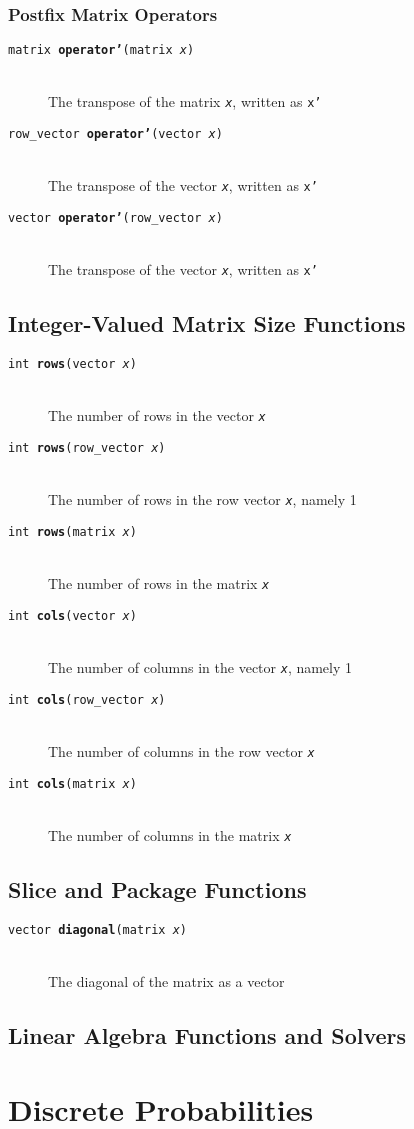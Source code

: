 \documentclass[10pt]{report}
\newcommand{\code}[1]{{\tt #1}}
\newcommand{\fitem}[4]{\item[{\tt #1 {\bfseries #2}(#3)}]\mbox{ } \\[4pt] #4}
\newcommand{\farg}[1]{{\tt\slshape #1}}
\begin{document}
\subsection{Postfix Matrix Operators}

\begin{description}
%
\fitem{matrix}{operator'}{matrix \farg{x}}{The transpose of the matrix
  \farg{x}, written as \code{x'}}
%
\fitem{row\_vector}{operator'}{vector \farg{x}}{The transpose of the vector
  \farg{x}, written as \code{x'}}
%
\fitem{vector}{operator'}{row\_vector \farg{x}}{The transpose of the vector
  \farg{x}, written as \code{x'}}
%
\end{description}


\section{Integer-Valued Matrix Size Functions}

\begin{description}
%
\fitem{int}{rows}{vector \farg{x}}{The number of
rows in the vector \farg{x}}
%
\fitem{int}{rows}{row\_vector \farg{x}}{The number of
rows in the row vector \farg{x}, namely 1}
%
\fitem{int}{rows}{matrix \farg{x}}{The number of
rows in the matrix \farg{x}}
%
\fitem{int}{cols}{vector \farg{x}}{The number of columns
in the vector \farg{x}, namely 1}
%
\fitem{int}{cols}{row\_vector \farg{x}}{The number of columns
in the row vector \farg{x}}
%
\fitem{int}{cols}{matrix \farg{x}}{The number of columns
in the matrix \farg{x}}
\end{description}

\section{Slice and Package Functions}

\begin{description}
%
\fitem{vector}{diagonal}{matrix \farg{x}}{The diagonal
of the matrix as a vector}
%
\end{description}



\section{Linear Algebra Functions and Solvers}



\chapter{Discrete Probabilities}\label{discrete-prob-functions.chapter}
\end{document}
